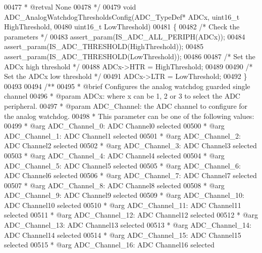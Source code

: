 \begin{DoxyCode}
00477 \textcolor{comment}{  * @retval None}
00478 \textcolor{comment}{  */}
00479 \textcolor{keywordtype}{void} ADC_AnalogWatchdogThresholdsConfig(ADC\_TypeDef* ADCx, uint16\_t HighThreshold,
00480                                         uint16\_t LowThreshold)
00481 \{
00482   \textcolor{comment}{/* Check the parameters */}
00483   assert_param(IS\_ADC\_ALL\_PERIPH(ADCx));
00484   assert_param(IS\_ADC\_THRESHOLD(HighThreshold));
00485   assert_param(IS\_ADC\_THRESHOLD(LowThreshold));
00486 
00487   \textcolor{comment}{/* Set the ADCx high threshold */}
00488   ADCx->HTR = HighThreshold;
00489 
00490   \textcolor{comment}{/* Set the ADCx low threshold */}
00491   ADCx->LTR = LowThreshold;
00492 \}
00493 
00494 \textcolor{comment}{/**}
00495 \textcolor{comment}{  * @brief  Configures the analog watchdog guarded single channel}
00496 \textcolor{comment}{  * @param  ADCx: where x can be 1, 2 or 3 to select the ADC peripheral.}
00497 \textcolor{comment}{  * @param  ADC\_Channel: the ADC channel to configure for the analog watchdog. }
00498 \textcolor{comment}{  *          This parameter can be one of the following values:}
00499 \textcolor{comment}{  *            @arg ADC\_Channel\_0: ADC Channel0 selected}
00500 \textcolor{comment}{  *            @arg ADC\_Channel\_1: ADC Channel1 selected}
00501 \textcolor{comment}{  *            @arg ADC\_Channel\_2: ADC Channel2 selected}
00502 \textcolor{comment}{  *            @arg ADC\_Channel\_3: ADC Channel3 selected}
00503 \textcolor{comment}{  *            @arg ADC\_Channel\_4: ADC Channel4 selected}
00504 \textcolor{comment}{  *            @arg ADC\_Channel\_5: ADC Channel5 selected}
00505 \textcolor{comment}{  *            @arg ADC\_Channel\_6: ADC Channel6 selected}
00506 \textcolor{comment}{  *            @arg ADC\_Channel\_7: ADC Channel7 selected}
00507 \textcolor{comment}{  *            @arg ADC\_Channel\_8: ADC Channel8 selected}
00508 \textcolor{comment}{  *            @arg ADC\_Channel\_9: ADC Channel9 selected}
00509 \textcolor{comment}{  *            @arg ADC\_Channel\_10: ADC Channel10 selected}
00510 \textcolor{comment}{  *            @arg ADC\_Channel\_11: ADC Channel11 selected}
00511 \textcolor{comment}{  *            @arg ADC\_Channel\_12: ADC Channel12 selected}
00512 \textcolor{comment}{  *            @arg ADC\_Channel\_13: ADC Channel13 selected}
00513 \textcolor{comment}{  *            @arg ADC\_Channel\_14: ADC Channel14 selected}
00514 \textcolor{comment}{  *            @arg ADC\_Channel\_15: ADC Channel15 selected}
00515 \textcolor{comment}{  *            @arg ADC\_Channel\_16: ADC Channel16 selected}

\end{DoxyCode}
